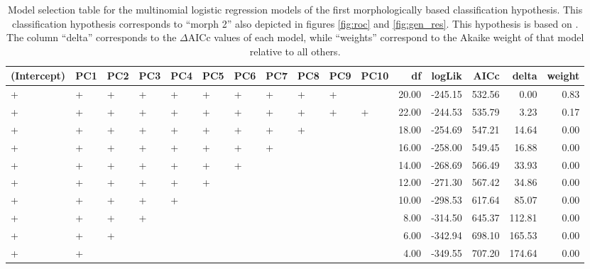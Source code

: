 \documentclass[12pt,letterpaper]{article}\usepackage{graphicx, color}
\begin{document}
\begin{table}
  \centering
{\small
\begin{tabular}{lllllllllllrrrrr}
  \hline
(Intercept) & PC1 & PC2 & PC3 & PC4 & PC5 & PC6 & PC7 & PC8 & PC9 & PC10 & df & logLik & AICc & delta & weight \\ 
  \hline
+ & + & + & + & + & + & + & + & + & + &  & 20.00 & -245.15 & 532.56 & 0.00 & 0.83 \\ 
  + & + & + & + & + & + & + & + & + & + & + & 22.00 & -244.53 & 535.79 & 3.23 & 0.17 \\ 
  + & + & + & + & + & + & + & + & + &  &  & 18.00 & -254.69 & 547.21 & 14.64 & 0.00 \\ 
  + & + & + & + & + & + & + & + &  &  &  & 16.00 & -258.00 & 549.45 & 16.88 & 0.00 \\ 
  + & + & + & + & + & + & + &  &  &  &  & 14.00 & -268.69 & 566.49 & 33.93 & 0.00 \\ 
  + & + & + & + & + & + &  &  &  &  &  & 12.00 & -271.30 & 567.42 & 34.86 & 0.00 \\ 
  + & + & + & + & + &  &  &  &  &  &  & 10.00 & -298.53 & 617.64 & 85.07 & 0.00 \\ 
  + & + & + & + &  &  &  &  &  &  &  & 8.00 & -314.50 & 645.37 & 112.81 & 0.00 \\ 
  + & + & + &  &  &  &  &  &  &  &  & 6.00 & -342.94 & 698.10 & 165.53 & 0.00 \\ 
  + & + &  &  &  &  &  &  &  &  &  & 4.00 & -349.55 & 707.20 & 174.64 & 0.00 \\ 
   \hline
\end{tabular}
}


  \caption{Model selection table for the multinomial logistic regression models of the first morphologically based classification hypothesis. This classification hypothesis corresponds to ``morph 2'' also depicted in figures \ref{fig:roc} and \ref{fig:gen_res}. This hypothesis is based on \citet{Seeliger1945}. The column ``delta'' corresponds to the \(\Delta\)AICc values of each model, while ``weights'' correspond to the Akaike weight of that model relative to all others.}
  \label{tab:mod_sel_2}
\end{table}
\end{document}
